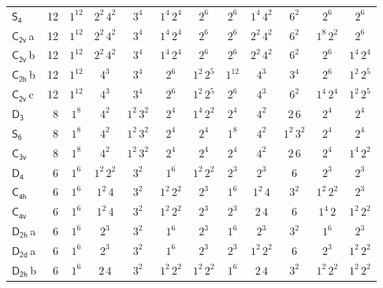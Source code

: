 \documentclass[10pt,a4paper]{article}
\numberwithin{equation}{section}
\newcommand{\grp}[1]{\mathsf{#1}}
\newcommand{\clsletter}[1]{\,{\scriptsize\color{black!55}#1}}
\begin{document}
{\begin{longtable}{@{}lrcccccccccc@{}}
\href{S4.pdf}{$\grp{S_{4}}$} & 12 & $1^{12}$ & $2^{2}\,4^{2}$ & $3^{4}$ & $1^{4}\,2^{4}$ & $2^{6}$ & $2^{6}$ & $1^{4}\,4^{2}$ & $6^{2}$ & $2^{6}$ & $2^{6}$\\
\href{C2v.pdf}{$\grp{C_{2v}}$}\clsletter{a} & 12 & $1^{12}$ & $2^{2}\,4^{2}$ & $3^{4}$ & $1^{4}\,2^{4}$ & $2^{6}$ & $2^{6}$ & $2^{2}\,4^{2}$ & $6^{2}$ & $1^{8}\,2^{2}$ & $2^{6}$\\
\href{C2v.pdf}{$\grp{C_{2v}}$}\clsletter{b} & 12 & $1^{12}$ & $2^{2}\,4^{2}$ & $3^{4}$ & $1^{4}\,2^{4}$ & $2^{6}$ & $2^{6}$ & $2^{2}\,4^{2}$ & $6^{2}$ & $2^{6}$ & $1^{4}\,2^{4}$\\
\href{C2h.pdf}{$\grp{C_{2h}}$}\clsletter{b} & 12 & $1^{12}$ & $4^{3}$ & $3^{4}$ & $2^{6}$ & $1^{2}\,2^{5}$ & $1^{12}$ & $4^{3}$ & $3^{4}$ & $2^{6}$ & $1^{2}\,2^{5}$\\
\href{C2v.pdf}{$\grp{C_{2v}}$}\clsletter{c} & 12 & $1^{12}$ & $4^{3}$ & $3^{4}$ & $2^{6}$ & $1^{2}\,2^{5}$ & $2^{6}$ & $4^{3}$ & $6^{2}$ & $1^{4}\,2^{4}$ & $1^{2}\,2^{5}$\\
\href{D3.pdf}{$\grp{D_{3}}$} & 8 & $1^{8}$ & $4^{2}$ & $1^{2}\,3^{2}$ & $2^{4}$ & $1^{4}\,2^{2}$ & $2^{4}$ & $4^{2}$ & $2\,6$ & $2^{4}$ & $2^{4}$\\
\href{S6.pdf}{$\grp{S_{6}}$} & 8 & $1^{8}$ & $4^{2}$ & $1^{2}\,3^{2}$ & $2^{4}$ & $2^{4}$ & $1^{8}$ & $4^{2}$ & $1^{2}\,3^{2}$ & $2^{4}$ & $2^{4}$\\
\href{C3v.pdf}{$\grp{C_{3v}}$} & 8 & $1^{8}$ & $4^{2}$ & $1^{2}\,3^{2}$ & $2^{4}$ & $2^{4}$ & $2^{4}$ & $4^{2}$ & $2\,6$ & $2^{4}$ & $1^{4}\,2^{2}$\\
\href{D4.pdf}{$\grp{D_{4}}$} & 6 & $1^{6}$ & $1^{2}\,2^{2}$ & $3^{2}$ & $1^{6}$ & $1^{2}\,2^{2}$ & $2^{3}$ & $2^{3}$ & $6$ & $2^{3}$ & $2^{3}$\\
\href{C4h.pdf}{$\grp{C_{4h}}$} & 6 & $1^{6}$ & $1^{2}\,4$ & $3^{2}$ & $1^{2}\,2^{2}$ & $2^{3}$ & $1^{6}$ & $1^{2}\,4$ & $3^{2}$ & $1^{2}\,2^{2}$ & $2^{3}$\\
\href{C4v.pdf}{$\grp{C_{4v}}$} & 6 & $1^{6}$ & $1^{2}\,4$ & $3^{2}$ & $1^{2}\,2^{2}$ & $2^{3}$ & $2^{3}$ & $2\,4$ & $6$ & $1^{4}\,2$ & $1^{2}\,2^{2}$\\
\href{D2h.pdf}{$\grp{D_{2h}}$}\clsletter{a} & 6 & $1^{6}$ & $2^{3}$ & $3^{2}$ & $1^{6}$ & $2^{3}$ & $1^{6}$ & $2^{3}$ & $3^{2}$ & $1^{6}$ & $2^{3}$\\
\href{D2d.pdf}{$\grp{D_{2d}}$}\clsletter{a} & 6 & $1^{6}$ & $2^{3}$ & $3^{2}$ & $1^{6}$ & $2^{3}$ & $2^{3}$ & $1^{2}\,2^{2}$ & $6$ & $2^{3}$ & $1^{2}\,2^{2}$\\
\href{D2h.pdf}{$\grp{D_{2h}}$}\clsletter{b} & 6 & $1^{6}$ & $2\,4$ & $3^{2}$ & $1^{2}\,2^{2}$ & $1^{2}\,2^{2}$ & $1^{6}$ & $2\,4$ & $3^{2}$ & $1^{2}\,2^{2}$ & $1^{2}\,2^{2}$\\

\end{longtable}}
\end{document}
